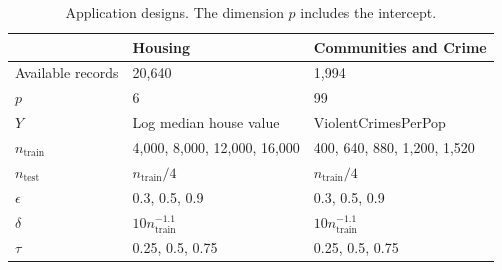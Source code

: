 \begin{table}[!htb]
\centering\begingroup

\caption{Application designs. The dimension $p$ includes the intercept.}
\label{tab:real-data-design}
\small\journaltablestyle
\begin{tabularx}{\linewidth}{@{}>{\raggedright\arraybackslash}p{.23\linewidth}XX@{}}
\toprule
 & Housing & Communities and Crime \\
\midrule
Available records & 20,640 & 1,994 \\
$p$ & 6 & 99 \\
$Y$ & Log median house value & ViolentCrimesPerPop \\
$n_{\mathrm{train}}$ & 4,000, 8,000, 12,000, 16,000 & 400, 640, 880, 1,200, 1,520 \\
$n_{\mathrm{test}}$ & $n_{\mathrm{train}}/4$ & $n_{\mathrm{train}}/4$ \\
$\epsilon$ & 0.3, 0.5, 0.9 & 0.3, 0.5, 0.9 \\
$\delta$ & $10n_{\mathrm{train}}^{-1.1}$ & $10n_{\mathrm{train}}^{-1.1}$ \\
$\tau$ & 0.25, 0.5, 0.75 & 0.25, 0.5, 0.75 \\
\bottomrule
\end{tabularx}
\endgroup
\end{table}
